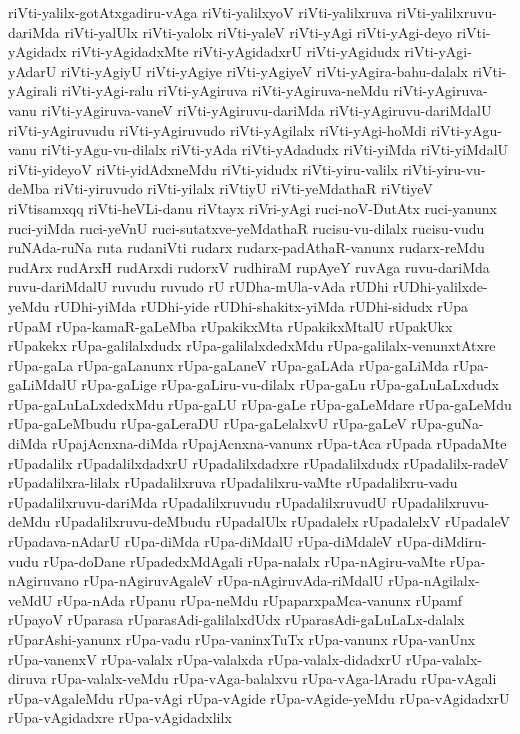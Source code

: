 {riVti-yalilx-gotAtxgadiru-vAga
riVti-yalilxyoV
riVti-yalilxruva
riVti-yalilxruvu-dariMda
riVti-yalUlx
riVti-yalolx
riVti-yaleV
riVti-yAgi
riVti-yAgi-deyo
riVti-yAgidadx
riVti-yAgidadxMte
riVti-yAgidadxrU
riVti-yAgidudx
riVti-yAgi-yAdarU
riVti-yAgiyU
riVti-yAgiye
riVti-yAgiyeV
riVti-yAgira-bahu-dalalx
riVti-yAgirali
riVti-yAgi-ralu
riVti-yAgiruva
riVti-yAgiruva-neMdu
riVti-yAgiruva-vanu
riVti-yAgiruva-vaneV
riVti-yAgiruvu-dariMda
riVti-yAgiruvu-dariMdalU
riVti-yAgiruvudu
riVti-yAgiruvudo
riVti-yAgilalx
riVti-yAgi-hoMdi
riVti-yAgu-vanu
riVti-yAgu-vu-dilalx
riVti-yAda
riVti-yAdadudx
riVti-yiMda
riVti-yiMdalU
riVti-yideyoV
riVti-yidAdxneMdu
riVti-yidudx
riVti-yiru-valilx
riVti-yiru-vu-deMba
riVti-yiruvudo
riVti-yilalx
riVtiyU
riVti-yeMdathaR
riVtiyeV
riVtisamxqq
riVti-heVLi-danu
riVtayx
riVri-yAgi
ruci-noV-DutAtx
ruci-yanunx
ruci-yiMda
ruci-yeVnU
ruci-sutatxve-yeMdathaR
rucisu-vu-dilalx
rucisu-vudu
ruNAda-ruNa
ruta
rudaniVti
rudarx
rudarx-padAthaR-vanunx
rudarx-reMdu
rudArx
rudArxH
rudArxdi
rudorxV
rudhiraM
rupAyeY
ruvAga
ruvu-dariMda
ruvu-dariMdalU
ruvudu
ruvudo
rU
rUDha-mUla-vAda
rUDhi
rUDhi-yalilxde-yeMdu
rUDhi-yiMda
rUDhi-yide
rUDhi-shakitx-yiMda
rUDhi-sidudx
rUpa
rUpaM
rUpa-kamaR-gaLeMba
rUpakikxMta
rUpakikxMtalU
rUpakUkx
rUpakekx
rUpa-galilalxdudx
rUpa-galilalxdedxMdu
rUpa-galilalx-venunxtAtxre
rUpa-gaLa
rUpa-gaLanunx
rUpa-gaLaneV
rUpa-gaLAda
rUpa-gaLiMda
rUpa-gaLiMdalU
rUpa-gaLige
rUpa-gaLiru-vu-dilalx
rUpa-gaLu
rUpa-gaLuLaLxdudx
rUpa-gaLuLaLxdedxMdu
rUpa-gaLU
rUpa-gaLe
rUpa-gaLeMdare
rUpa-gaLeMdu
rUpa-gaLeMbudu
rUpa-gaLeraDU
rUpa-gaLelalxvU
rUpa-gaLeV
rUpa-guNa-diMda
rUpajAcnxna-diMda
rUpajAcnxna-vanunx
rUpa-tAca
rUpada
rUpadaMte
rUpadalilx
rUpadalilxdadxrU
rUpadalilxdadxre
rUpadalilxdudx
rUpadalilx-radeV
rUpadalilxra-lilalx
rUpadalilxruva
rUpadalilxru-vaMte
rUpadalilxru-vadu
rUpadalilxruvu-dariMda
rUpadalilxruvudu
rUpadalilxruvudU
rUpadalilxruvu-deMdu
rUpadalilxruvu-deMbudu
rUpadalUlx
rUpadalelx
rUpadalelxV
rUpadaleV
rUpadava-nAdarU
rUpa-diMda
rUpa-diMdalU
rUpa-diMdaleV
rUpa-diMdiru-vudu
rUpa-doDane
rUpadedxMdAgali
rUpa-nalalx
rUpa-nAgiru-vaMte
rUpa-nAgiruvano
rUpa-nAgiruvAgaleV
rUpa-nAgiruvAda-riMdalU
rUpa-nAgilalx-veMdU
rUpa-nAda
rUpanu
rUpa-neMdu
rUpaparxpaMca-vanunx
rUpamf
rUpayoV
rUparasa
rUparasAdi-galilalxdUdx
rUparasAdi-gaLuLaLx-dalalx
rUparAshi-yanunx
rUpa-vadu
rUpa-vaninxTuTx
rUpa-vanunx
rUpa-vanUnx
rUpa-vanenxV
rUpa-valalx
rUpa-valalxda
rUpa-valalx-didadxrU
rUpa-valalx-diruva
rUpa-valalx-veMdu
rUpa-vAga-balalxvu
rUpa-vAga-lAradu
rUpa-vAgali
rUpa-vAgaleMdu
rUpa-vAgi
rUpa-vAgide
rUpa-vAgide-yeMdu
rUpa-vAgidadxrU
rUpa-vAgidadxre
rUpa-vAgidadxlilx
}
